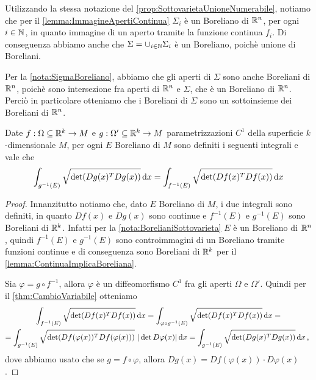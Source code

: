 \begin{remark}\label{nota:SigmaBoreliano}
	Utilizzando la stessa notazione del \cref{prop:SottovarietaUnioneNumerabile}, notiamo che per il \cref{lemma:ImmagineApertiContinua} $\Sigma_i$ è un Boreliano di $\mathbb R^n$, per ogni $i\in\mathbb N$, in quanto immagine di un aperto tramite la funzione continua $f_i$. Di conseguenza abbiamo anche che $\Sigma=\cup_{i\in\mathbb N}\Sigma_i$ è un Boreliano, poichè unione di Boreliani.  
\end{remark}

\begin{remark}\label{nota:BorelianiSottovarieta}
	Per la \cref{nota:SigmaBoreliano}, abbiamo che gli aperti di $\Sigma$ sono anche Boreliani di $\mathbb R^n$, poichè sono intersezione fra aperti di $\mathbb R^n$ e $\Sigma$, che è un Boreliano di $\mathbb R^n$. Perciò in particolare otteniamo che i Boreliani di $\Sigma$ sono un sottoinsieme dei Boreliani di $\mathbb R^n$.
\end{remark}

\begin{lemma}\label{lemma:InvarianzaImmersione}
	Date $f:\Omega\subseteq\mathbb R^k\to M$ e $g:\Omega'\subseteq\mathbb R^k\to M$ parametrizzazioni $C^1$ della superficie $k$-dimensionale $M$, per ogni $E$ Boreliano di $M$ sono definiti i seguenti integrali e vale che 
	\begin{equation*}
		\int_{g^{-1}(E)}\sqrt{\det(Dg(x)^TDg(x))}\,\mathrm d x=\int_{f^{-1}(E)}\sqrt{\det(Df(x)^TDf(x))}\,\mathrm d x
	\end{equation*}
\end{lemma}
\begin{proof}
	Innanzitutto notiamo che, dato $E$ Boreliano di $M$, i due integrali sono definiti, in quanto $Df(x)$ e $Dg(x)$ sono continue e $f^{-1}(E)$ e $g^{-1}(E)$ sono Boreliani di $\mathbb R^k$. Infatti per la \cref{nota:BorelianiSottovarieta} $E$ è un Boreliano di $\mathbb R^n$, quindi $f^{-1}(E)$ e $g^{-1}(E)$ sono controimmagini di un Boreliano tramite funzioni continue e di conseguenza sono Boreliani di $\mathbb R^k$ per il \cref{lemma:ContinuaImplicaBoreliana}.

	Sia $\varphi=g\circ f^{-1}$, allora $\varphi$ è un diffeomorfismo $C^1$ fra gli aperti $\Omega$ e $\Omega'$. Quindi per il \cref{thm:CambioVariabile} otteniamo
	\begin{multline*}
		\int_{f^{-1}(E)}\sqrt{\det(Df(x)^TDf(x))}\de x=\int_{\varphi\circ g^{-1}(E)}\sqrt{\det(Df(x)^TDf(x))}\de x=\\
		=\int_{g^{-1}(E)}\sqrt{\det(Df(\varphi(x))^TDf(\varphi(x)))}\ |\det D\varphi(x)|\de x=\int_{g^{-1}(E)}\sqrt{\det(Dg(x)^TDg(x))}\de x\virgola
	\end{multline*}
	dove abbiamo usato che se $g=f\circ \varphi$, allora $Dg(x)=Df(\varphi(x))\cdot D\varphi(x)$.
\end{proof}

